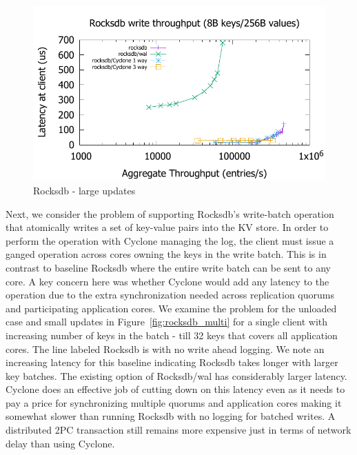 \documentclass[10pt, preprint, nonatbib]{sigplanconf}
\begin{document}
\begin{figure}
\includegraphics[scale=0.6]{results2/rocksdb_256.pdf}
\caption{Rocksdb - large updates}
\label{fig:rocksdb_256}
\end{figure}

Next, we consider the problem of supporting Rocksdb's write-batch operation that
atomically writes a set of key-value pairs into the KV store. In order to
perform the operation with Cyclone managing the log, the client must issue a
ganged operation across cores owning the keys in the write batch. This is in
contrast to baseline Rocksdb where the entire write batch can be sent to any
core. A key concern here was whether Cyclone would add any latency to the
operation due to the extra synchronization needed across replication quorums and
participating application cores. We examine the problem for the unloaded case
and small updates in Figure~\ref{fig:rocksdb_multi} for a single client with
increasing number of keys in the batch - till 32 keys that covers all
application cores. The line labeled Rocksdb is with no write ahead logging. We
note an increasing latency for this baseline indicating Rocksdb takes longer
with larger key batches. The existing option of Rocksdb/wal has considerably
larger latency. Cyclone does an effective job of cutting down on this latency
even as it needs to pay a price for synchronizing multiple quorums and
application cores making it somewhat slower than running Rocksdb with no logging
for batched writes. A distributed 2PC transaction still remains more expensive
just in terms of network delay than using Cyclone.
\end{document}
